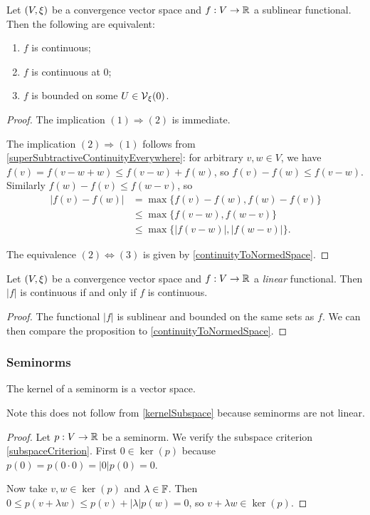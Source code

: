 \begin{proposition} \label{sublinearContinuity}
Let $\sSet{V,\xi}$ be a convergence vector space and $f: V\to \mathbb{R}$ a sublinear functional. Then the following are equivalent:
\begin{enumerate}
\item $f$ is continuous;
\item $f$ is continuous at $0$;
\item $f$ is bounded on some $U\in\operatorname{\mathcal{V}}_\xi(0)$.
\end{enumerate}
\end{proposition}
\begin{proof}
The implication $(1) \Rightarrow (2)$ is immediate. 

The implication $(2) \Rightarrow (1)$ follows from \ref{superSubtractiveContinuityEverywhere}: 
for arbitrary $v,w\in V$, we have $f(v) = f(v-w+w) \leq f(v-w) + f(w)$, so $f(v) - f(w) \leq f(v-w)$. Similarly $f(w) - f(v) \leq f(w-v)$, so
\begin{align*}
|f(v) - f(w)| &= \max\{f(v) - f(w), f(w) - f(v)\} \\
&\leq \max\{f(v-w), f(w-v)\} \\
&\leq \max\{|f(v-w)|, |f(w-v)|\}.
\end{align*}

The equivalence $(2) \Leftrightarrow (3)$ is given by \ref{continuityToNormedSpace}.
\end{proof}
\begin{corollary} \label{continuityAbsFunctional}
Let $\sSet{V,\xi}$ be a convergence vector space and $f: V\to \mathbb{R}$ a \emph{linear} functional. Then $|f|$ is continuous \textup{if and only if} $f$ is continuous.
\end{corollary}
\begin{proof}
The functional $|f|$ is sublinear and bounded on the same sets as $f$. We can then compare the proposition to \ref{continuityToNormedSpace}.
\end{proof}

\subsubsection{Seminorms}
\begin{lemma} \label{kernelSeminormVectorSpace}
The kernel of a seminorm is a vector space.
\end{lemma}
Note this does not follow from \ref{kernelSubspace} because seminorms are not linear.
\begin{proof}
Let $p:V\to \mathbb{R}$ be a seminorm. We verify the subspace criterion \ref{subspaceCriterion}. First $0\in\ker(p)$ because $p(0) = p(0\cdot 0) = |0|p(0) = 0$.

Now take $v,w\in \ker(p)$ and $\lambda\in \mathbb{F}$. Then $0\leq p(v+\lambda w) \leq p(v)+|\lambda|p(w) = 0$, so $v+\lambda w\in\ker(p)$.
\end{proof}

